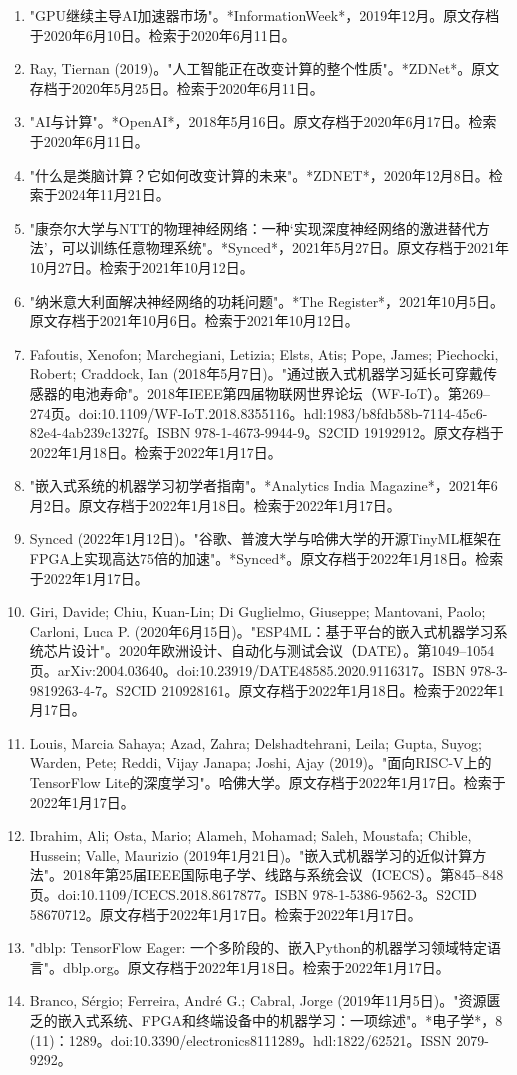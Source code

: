 \begin{enumerate}
\item "GPU继续主导AI加速器市场"。*InformationWeek*，2019年12月。原文存档于2020年6月10日。检索于2020年6月11日。
\item Ray, Tiernan (2019)。"人工智能正在改变计算的整个性质"。*ZDNet*。原文存档于2020年5月25日。检索于2020年6月11日。
\item "AI与计算"。*OpenAI*，2018年5月16日。原文存档于2020年6月17日。检索于2020年6月11日。
\item "什么是类脑计算？它如何改变计算的未来"。*ZDNET*，2020年12月8日。检索于2024年11月21日。
\item "康奈尔大学与NTT的物理神经网络：一种‘实现深度神经网络的激进替代方法’，可以训练任意物理系统"。*Synced*，2021年5月27日。原文存档于2021年10月27日。检索于2021年10月12日。
\item "纳米意大利面解决神经网络的功耗问题"。*The Register*，2021年10月5日。原文存档于2021年10月6日。检索于2021年10月12日。
\item Fafoutis, Xenofon; Marchegiani, Letizia; Elsts, Atis; Pope, James; Piechocki, Robert; Craddock, Ian (2018年5月7日)。"通过嵌入式机器学习延长可穿戴传感器的电池寿命"。2018年IEEE第四届物联网世界论坛（WF-IoT）。第269–274页。doi:10.1109/WF-IoT.2018.8355116。hdl:1983/b8fdb58b-7114-45c6-82e4-4ab239c1327f。ISBN 978-1-4673-9944-9。S2CID 19192912。原文存档于2022年1月18日。检索于2022年1月17日。
\item "嵌入式系统的机器学习初学者指南"。*Analytics India Magazine*，2021年6月2日。原文存档于2022年1月18日。检索于2022年1月17日。
\item Synced (2022年1月12日)。"谷歌、普渡大学与哈佛大学的开源TinyML框架在FPGA上实现高达75倍的加速"。*Synced*。原文存档于2022年1月18日。检索于2022年1月17日。
\item Giri, Davide; Chiu, Kuan-Lin; Di Guglielmo, Giuseppe; Mantovani, Paolo; Carloni, Luca P. (2020年6月15日)。"ESP4ML：基于平台的嵌入式机器学习系统芯片设计"。2020年欧洲设计、自动化与测试会议（DATE）。第1049–1054页。arXiv:2004.03640。doi:10.23919/DATE48585.2020.9116317。ISBN 978-3-9819263-4-7。S2CID 210928161。原文存档于2022年1月18日。检索于2022年1月17日。
\item Louis, Marcia Sahaya; Azad, Zahra; Delshadtehrani, Leila; Gupta, Suyog; Warden, Pete; Reddi, Vijay Janapa; Joshi, Ajay (2019)。"面向RISC-V上的TensorFlow Lite的深度学习"。哈佛大学。原文存档于2022年1月17日。检索于2022年1月17日。
\item Ibrahim, Ali; Osta, Mario; Alameh, Mohamad; Saleh, Moustafa; Chible, Hussein; Valle, Maurizio (2019年1月21日)。"嵌入式机器学习的近似计算方法"。2018年第25届IEEE国际电子学、线路与系统会议（ICECS）。第845–848页。doi:10.1109/ICECS.2018.8617877。ISBN 978-1-5386-9562-3。S2CID 58670712。原文存档于2022年1月17日。检索于2022年1月17日。
\item "dblp: TensorFlow Eager: 一个多阶段的、嵌入Python的机器学习领域特定语言"。dblp.org。原文存档于2022年1月18日。检索于2022年1月17日。
\item Branco, Sérgio; Ferreira, André G.; Cabral, Jorge (2019年11月5日)。"资源匮乏的嵌入式系统、FPGA和终端设备中的机器学习：一项综述"。*电子学*，8 (11)：1289。doi:10.3390/electronics8111289。hdl:1822/62521。ISSN 2079-9292。
\end{enumerate}
